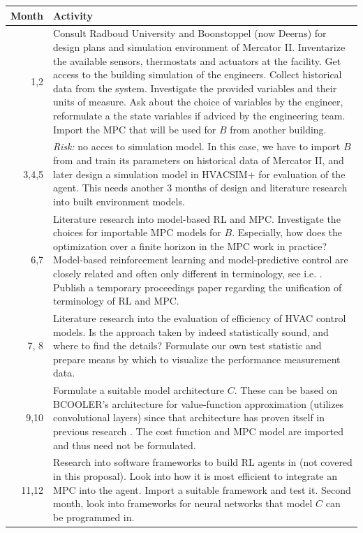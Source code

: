 \documentclass{article}
\theoremstyle{definition}
\theoremstyle{remark}
\begin{document}
\begin{table}
\centering\begin{tabular}{r|p{5in}}

Month & Activity\\ 
\hline
1,2 & Consult Radboud University and Boonstoppel (now Deerns) for design plans and simulation environment of Mercator II. Inventarize the available sensors, thermostats and actuators at the facility. Get access to the building simulation of the engineers. Collect historical data from the system. Investigate the provided variables and their units of measure. Ask about the choice of variables by the engineer, reformulate a the state variables if adviced by the engineering team. Import the MPC that will be used for $B$ from another building. \\
\hline
3,4,5 & \textit{Risk:} no acces to simulation model. In this case, we have to import $B$ from \cite{hollands} and train its parameters on historical data of Mercator II, and later design a simulation model in HVACSIM+ for evaluation of the agent. This needs another 3 months of design and literature research into built environment models.\\
\hline
6,7 & Literature research into model-based RL and MPC. Investigate the choices for importable MPC models for $B$. Especially, how does the optimization over a finite horizon in the MPC work in practice? Model-based reinforcement learning and model-predictive control are closely related and often only different in terminology, see i.e. \cite{Seita_2019}. Publish a temporary proceedings paper regarding the unification of terminology of RL and MPC.\\
\hline
7, 8 & Literature research into the evaluation of efficiency of HVAC control models. Is the approach taken by \cite{luo2022controlling} indeed statistically sound, and where to find the details? Formulate our own test statistic and prepare means by which to visualize the performance measurement data.\\
\hline
9,10 & Formulate a suitable model architecture $C$. These can be based on BCOOLER's architecture for value-function approximation (utilizes convolutional layers) since that architecture has proven itself in previous research \cite{luo2022controlling}. The cost function and MPC model are imported and thus need not be formulated.\\
\hline
11,12 & Research into software frameworks to build RL agents in (not covered in this proposal). Look into how it is most efficient to integrate an MPC into the agent. Import a suitable framework and test it. Second month, look into frameworks for neural networks that model $C$ can be programmed in.\\

\end{tabular}
\end{table}
\end{document}
